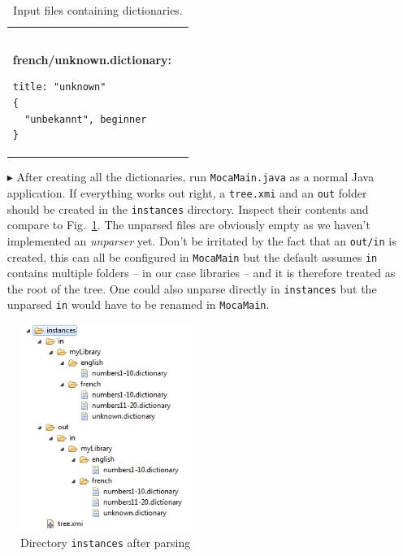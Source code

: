 \begin{enumerate}
\begin{table}
\begin{tabular}{p{6cm} p{6cm} }
\begin{verbatim}
\end{verbatim}
\textbf{french/unknown.dictionary:}
\begin{verbatim}
title: "unknown"
{
  "unbekannt", beginner
}
\end{verbatim}
  \\
\end{tabular}   
\caption{Input files containing dictionaries.}
\label{moca-inputdata}

\end{table}   

\item[$\blacktriangleright$] After creating all the dictionaries, run \texttt{MocaMain.java} as a normal Java application. If everything works out right, a \texttt{tree.xmi} and an \texttt{out} folder should be created in the \texttt{instances} directory.  Inspect their contents and compare to Fig.~\ref{fig:moca-9-ParseResult1}. The unparsed files are obviously empty as we haven't implemented an \emph{unparser} yet.  Don't be irritated by the fact that an \texttt{out/in} is created, this can all be configured in \texttt{MocaMain} but the default assumes \texttt{in} contains multiple folders -- in our case libraries -- and it is therefore treated as the root of the tree.  One could also unparse directly in \texttt{instances} but the unparsed \texttt{in} would have to be renamed in \texttt{MocaMain}.
\end{enumerate}

\clearpage
\begin{figure}[!htbp]
\begin{center}
 \includegraphics[width=0.5\textwidth]{pics/moca/2TextToMocaTree/9-ParseResult1}
  \caption{Directory \texttt{instances} after parsing}
  \label{fig:moca-9-ParseResult1}
\end{center}
\end{figure} 

